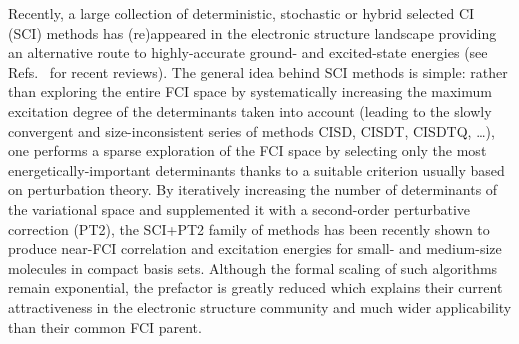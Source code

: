 \documentclass[aip,jcp,reprint,noshowkeys,superscriptaddress]{revtex4-1}
\begin{document}
Recently, a large collection of deterministic, stochastic or hybrid selected CI (SCI) methods \cite{Bender_1969,Whitten_1969,Huron_1973} has (re)appeared \cite{Booth_2009,Deustua_2017,Holmes_2016,Eriksen_2017,Xu_2018,Giner_2013,Giner_2015,Evangelista_2014,Tubman_2016,Liu_2016,Ohtsuka_2017,Zimmerman_2017,Coe_2018,Garniron_2018} in the electronic structure landscape providing an alternative route to highly-accurate ground- and excited-state energies \cite{Holmes_2017,Li_2018,Li_2020,Loos_2018a,Chien_2018,Loos_2019,Loos_2020b,Loos_2020c,Loos_2020e,qp2,Eriksen_2020,Yao_2020,Veril_2021} (see Refs.~ for recent reviews).
The general idea behind SCI methods is simple: rather than exploring the entire FCI space by systematically increasing the maximum excitation degree of the determinants taken into account (leading to the slowly convergent and size-inconsistent series of methods CISD, CISDT, CISDTQ, \ldots), one performs a sparse exploration of the FCI space by selecting only the most energetically-important determinants thanks to a suitable criterion usually based on perturbation theory. \cite{Huron_1973,Garniron_2017,Sharma_2017,qp2}
By iteratively increasing the number of determinants of the variational space and supplemented it with a second-order perturbative correction (PT2), the SCI+PT2 family of methods has been recently shown to produce near-FCI correlation and excitation energies for small- and medium-size molecules in compact basis sets.\cite{Holmes_2017,Loos_2018a,Chien_2018,Loos_2019,Loos_2020b,Loos_2020c,qp2,Veril_2021}
Although the formal scaling of such algorithms remain exponential, the prefactor is greatly reduced which explains their current attractiveness in the electronic structure community and much wider applicability than their common FCI parent. 
\end{document}
